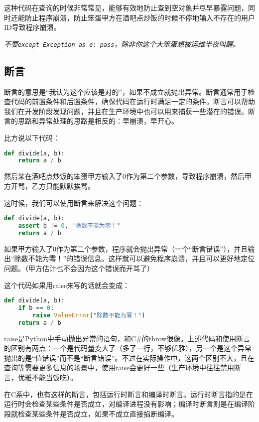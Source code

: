 \documentclass[../main.tex]{subfiles}
\begin{document}
这种代码在查询的时候非常常见，能够有效地防止查到空对象并尽早暴露问题，同时还能防止程序崩溃，防止笨蛋甲方在酒吧点炒饭的时候不停地输入不存在的用户ID导致程序崩溃。

\emph{不要\texttt{except Exception as e: pass}，除非你这个大笨蛋想被运维半夜叫醒。}

\subsection{断言}

断言的意思是“我认为这个应该是对的”，如果不成立就抛出异常。断言通常用于检查代码的前置条件和后置条件，确保代码在运行时满足一定的条件。断言可以帮助我们在开发阶段发现问题，并且在生产环境中也可以用来捕获一些潜在的错误。断言的思路和异常处理的思路是相反的：早崩溃，早开心。

比方说以下代码：

\begin{lstlisting}[language=Python]
def divide(a, b):
    return a / b
\end{lstlisting}

然后某在酒吧点炒饭的笨蛋甲方输入了0作为第二个参数，导致程序崩溃，然后甲方开骂，乙方只能默默挨骂。

这时候，我们可以使用断言来解决这个问题：
\begin{lstlisting}[language=Python]
def divide(a, b):
    assert b != 0, "除数不能为零！"
    return a / b
\end{lstlisting}

如果甲方输入了0作为第二个参数，程序就会抛出异常（一个“断言错误”），并且输出“除数不能为零！”的错误信息。这样就可以避免程序崩溃，并且可以更好地定位问题。（甲方估计也不会因为这个错误而开骂了）

这个代码如果用raise来写的话就会变成：
\begin{lstlisting}[language=Python]
def divide(a, b):
    if b == 0:
        raise ValueError("除数不能为零！")
    return a / b
\end{lstlisting}
raise是Python中手动抛出异常的语句，和C\#的throw很像。上述代码和使用断言的区别有两点：一个是代码量变大了（多了一行，不够优雅），另一个是这个异常抛出的是“值错误”而不是“断言错误”。不过在实际操作中，这两个区别不大，且在查询等需要更多信息的场景中，使用raise会更好一些（生产环境中往往禁用断言，优雅不能当饭吃）。

在C系中，也有这样的断言，包括运行时断言和编译时断言。运行时断言指的是在运行时会检查某些条件是否成立，对编译进程没有影响；编译时断言则是在编译阶段就检查某些条件是否成立，如果不成立直接掐断编译。
\end{document}

